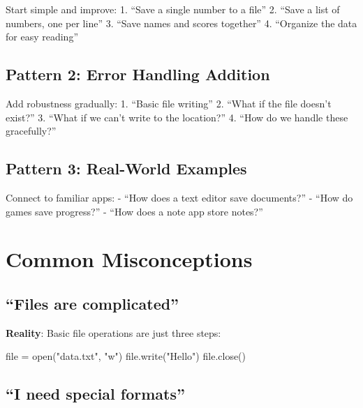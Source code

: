 \documentclass[
  letterpaper,
  DIV=11,
  numbers=noendperiod,
  oneside]{scrreprt}
\newenvironment{Shaded}{}{}
\newcommand{\BuiltInTok}[1]{\textcolor[rgb]{0.84,0.23,0.29}{#1}}
\newcommand{\NormalTok}[1]{\textcolor[rgb]{0.14,0.16,0.18}{#1}}
\newcommand{\OperatorTok}[1]{\textcolor[rgb]{0.14,0.16,0.18}{#1}}
\newcommand{\StringTok}[1]{\textcolor[rgb]{0.01,0.18,0.38}{#1}}
\begin{document}
Start simple and improve: 1. ``Save a single number to a file'' 2.
``Save a list of numbers, one per line'' 3. ``Save names and scores
together'' 4. ``Organize the data for easy reading''

\subsection{Pattern 2: Error Handling
Addition}\label{pattern-2-error-handling-addition}

Add robustness gradually: 1. ``Basic file writing'' 2. ``What if the
file doesn't exist?'' 3. ``What if we can't write to the location?'' 4.
``How do we handle these gracefully?''

\subsection{Pattern 3: Real-World
Examples}\label{pattern-3-real-world-examples}

Connect to familiar apps: - ``How does a text editor save documents?'' -
``How do games save progress?'' - ``How does a note app store notes?''

\section{Common Misconceptions}\label{common-misconceptions-7}

\subsection{``Files are complicated''}\label{files-are-complicated}

\textbf{Reality}: Basic file operations are just three steps:

\begin{Shaded}
\begin{Highlighting}[]
\BuiltInTok{file} \OperatorTok{=} \BuiltInTok{open}\NormalTok{(}\StringTok{"data.txt"}\NormalTok{, }\StringTok{"w"}\NormalTok{)}
\BuiltInTok{file}\NormalTok{.write(}\StringTok{"Hello"}\NormalTok{)}
\BuiltInTok{file}\NormalTok{.close()}
\end{Highlighting}
\end{Shaded}

\subsection{``I need special formats''}\label{i-need-special-formats}
\end{document}
